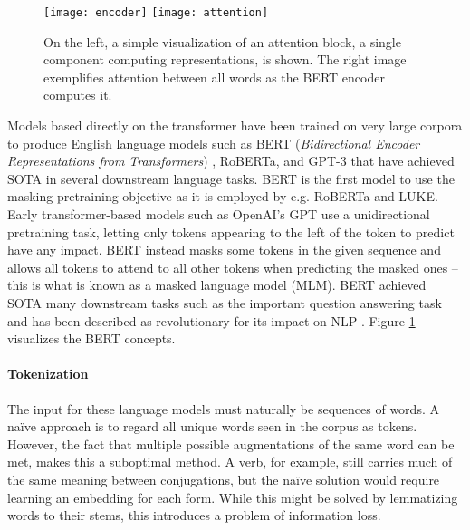 \documentclass[main.tex]{subfiles}
\begin{document}
\begin{figure}[H]
    \centering
        \texttt{[image: encoder]}
        \texttt{[image: attention]}
    \label{fig:transformer}
    \caption{
        On the left, a simple visualization of an attention block, a single component computing representations, is shown.
        The right image exemplifies attention between all words as the BERT encoder computes it.
        \protect\footnotemark
    }
\end{figure}\noindent
{}
Models based directly on the transformer have been trained on very large corpora to produce English language models such as BERT (\emph{Bidirectional Encoder Representations from Transformers}) \cite{devlin2019bert}, RoBERTa, \cite{liu2019roberta} and GPT-3 \cite{brown2020language} that have achieved SOTA in several downstream language tasks.
BERT is the first model to use the masking pretraining objective as it is employed by e.g. RoBERTa and LUKE.
Early transformer-based models such as OpenAI's GPT \cite{rashford2018gpt} use a unidirectional pretraining task, letting only tokens appearing to the left of the token to predict have any impact.
BERT instead masks some tokens in the given sequence and allows all tokens to attend to all other tokens when predicting the masked ones -- this is what is known as a masked language model (MLM).
BERT achieved SOTA many downstream tasks such as the important question answering task and has been described as revolutionary for its impact on NLP \cite{raj2019bert}.
Figure \ref{fig:transformer} visualizes the BERT concepts.

\paragraph{Tokenization}
The input for these language models must naturally be sequences of words.
A naïve approach is to regard all unique words seen in the corpus as tokens.
However, the fact that multiple possible augmentations of the same word can be met, makes this a suboptimal method.
A verb, for example, still carries much of the same meaning between conjugations, but the naïve solution would require learning an embedding for each form.
While this might be solved by lemmatizing words to their stems, this introduces a problem of information loss.
\end{document}
